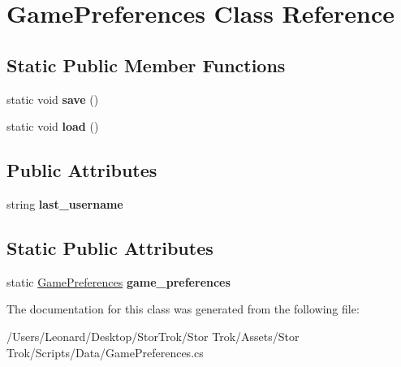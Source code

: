\hypertarget{class_game_preferences}{}\section{Game\+Preferences Class Reference}
\label{class_game_preferences}
\subsection*{Static Public Member Functions}
\begin{DoxyCompactItemize}
\item 
\mbox{\label{class_game_preferences_ab06a1e41cf247e1ee821a3ecc00c4179}} 
static void {\bfseries save} ()
\item 
\mbox{\label{class_game_preferences_a61d1ed4afb240764f1433a32a414683d}} 
static void {\bfseries load} ()
\end{DoxyCompactItemize}
\subsection*{Public Attributes}
\begin{DoxyCompactItemize}
\item 
\mbox{\label{class_game_preferences_a01d4f79d3433928531bf92fb5c5037b2}} 
string {\bfseries last\+\_\+username}
\end{DoxyCompactItemize}
\subsection*{Static Public Attributes}
\begin{DoxyCompactItemize}
\item 
\mbox{\label{class_game_preferences_a1e0d0f1a45a89ceb7889f38d96e4c104}} 
static \hyperlink{class_game_preferences}{Game\+Preferences} {\bfseries game\+\_\+preferences}
\end{DoxyCompactItemize}


The documentation for this class was generated from the following file\+:\begin{DoxyCompactItemize}
\item 
/\+Users/\+Leonard/\+Desktop/\+Stor\+Trok/\+Stor Trok/\+Assets/\+Stor Trok/\+Scripts/\+Data/Game\+Preferences.\+cs\end{DoxyCompactItemize}
